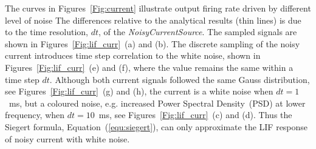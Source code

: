 \documentclass[runningheads,a4paper]{llncs}
\begin{document}
The curves in Figures~\ref{Fig:current} illustrate output firing rate driven by different level of noise
The differences relative to the analytical results (thin lines) is due to the time resolution, $dt$, of the \textit{NoisyCurrentSource}.
The sampled signals are shown in Figures~\ref{Fig:lif_curr}~(a) and (b).
The discrete sampling of the noisy current introduces time step correlation to the white noise, shown in Figures~\ref{Fig:lif_curr}~(e) and (f), where the value remains the same within a time step $dt$.
Although both current signals followed the same Gauss distribution, see Figures~\ref{Fig:lif_curr}~(g) and (h), the current is a white noise when $dt=1$~ms, but a coloured noise, e.g. increased Power Spectral Density~(PSD) at lower frequency, when $dt=10$~ms, see Figures~\ref{Fig:lif_curr}~(c) and (d).
Thus the Siegert formula, Equation~(\ref{equ:siegert}), can only approximate the LIF response of noisy current with white noise.


\end{document}

